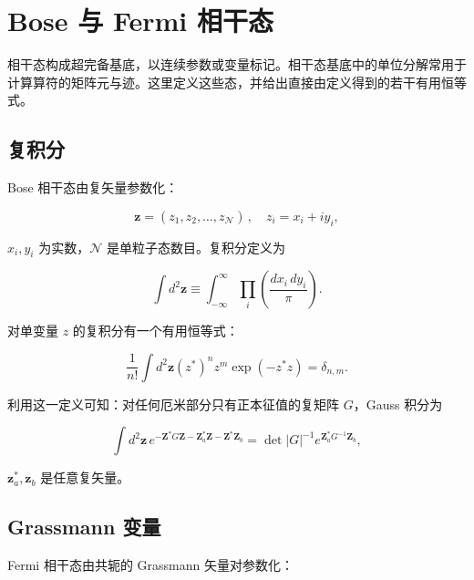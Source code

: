 \chapter{Bose 与 Fermi 相干态}

相干态构成超完备基底，以连续参数或变量标记。相干态基底中的单位分解常用于计算算符的矩阵元与迹。这里定义这些态，并给出直接由定义得到的若干有用恒等式。

\section{复积分}

Bose 相干态由复矢量参数化：

\begin{equation*}
\mathbf {z} = \left( z _ {1}, z _ {2}, \dots , z _ {\mathcal {N}} \right) \, , \quad z _ {i} = x _ {i} + iy _ {i} ,
\tag{C.1}
\end{equation*}

$x_{i}, y_{i}$ 为实数，$\mathcal{N}$ 是单粒子态数目。复积分定义为

\begin{equation*}
\int d ^ {2} \mathbf {z} \equiv \int_{- \infty} ^ {\infty} \prod_ {i} \left( \frac {dx _ {i} \, dy _ {i}}{\pi} \right).
\tag{C.2}
\end{equation*}

对单变量 $z$ 的复积分有一个有用恒等式：

\begin{equation*}
\frac {1}{n !} \int d ^ {2} \mathbf {z} \left( z ^ {*} \right) ^ {n} z ^ {m} \exp \left( - z ^ {*} z \right) = \delta_{n, m}.
\tag{C.3}
\end{equation*}

利用这一定义可知：对任何厄米部分只有正本征值的复矩阵 $G$，Gauss 积分为

\begin{equation*}
\int d ^ {2} \mathbf {z} \, e ^ {- \mathbf {Z} ^ {*} G \mathbf {Z} - \mathbf {Z} _ {a} ^ {*} \mathbf {Z} - \mathbf {Z} ^ {*} \mathbf {Z} _ {b}} = \det | G | ^ {- 1} e ^ {\mathbf {Z} _ {a} ^ {*} G ^ {- 1} \mathbf {Z} _ {b}} ,
\tag{C.4}
\end{equation*}

$\mathbf{z}_a^*, \mathbf{z}_b$ 是任意复矢量。

\section{Grassmann 变量}

Fermi 相干态由共轭的 Grassmann 矢量对参数化：

